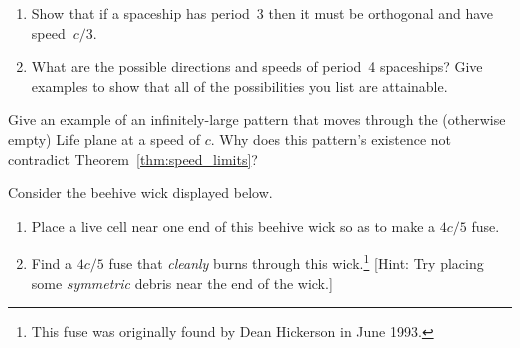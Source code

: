 \begin{multicols}{2}
\begin{problem}
\begin{enumerate}[label=\bf\color{ocre}(\alph*)]
			\item Show that if a spaceship has period~3 then it must be orthogonal and have speed~$c/3$.
			
			\item What are the possible directions and speeds of period~4 spaceships? Give examples to show that all of the possibilities you list are attainable.
		\end{enumerate}
	\end{problem}
	
	
	\mfilbreak
	
	
	\begin{problem}\label{exer:infinite_spaceship} 
		Give an example of an infinitely-large pattern that moves through the (otherwise empty) Life plane at a speed of $c$. Why does this pattern's existence not contradict Theorem~\ref{thm:speed_limits}?
	\end{problem}
	
	
	\mfilbreak
	
	
	\begin{problem}\label{exer:4c5_fuse}
		Consider the beehive wick displayed below.
		\begin{center}
		\end{center}
		
		\begin{enumerate}[label=\bf\color{ocre}(\alph*)]
			\item {} Place a live cell near one end of this beehive wick so as to make a $4c/5$ fuse.
			
			\item {} Find a $4c/5$ fuse that \emph{cleanly} burns through this wick.\footnote{This fuse was originally found by Dean Hickerson in June 1993.} [Hint: Try placing some \emph{symmetric} debris near the end of the wick.]
		\end{enumerate}
	\end{problem}
	

\end{multicols}
